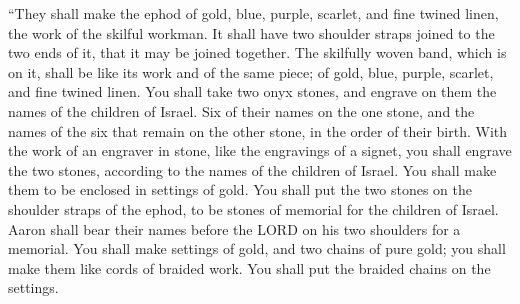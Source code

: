  ``They shall make the ephod of gold, blue, purple, scarlet,
and fine twined linen, the work of the skilful workman.  It
shall have two shoulder straps joined to the two ends of it, that it may
be joined together.  The skilfully woven band, which is on
it, shall be like its work and of the same piece; of gold, blue, purple,
scarlet, and fine twined linen.  You shall take two onyx
stones, and engrave on them the names of the children of Israel.
 Six of their names on the one stone, and the names of the
six that remain on the other stone, in the order of their birth.
 With the work of an engraver in stone, like the engravings
of a signet, you shall engrave the two stones, according to the names of
the children of Israel. You shall make them to be enclosed in settings
of gold.  You shall put the two stones on the shoulder
straps of the ephod, to be stones of memorial for the children of
Israel. Aaron shall bear their names before the LORD on his two
shoulders for a memorial.  You shall make settings of gold,
 and two chains of pure gold; you shall make them like
cords of braided work. You shall put the braided chains on the settings.

